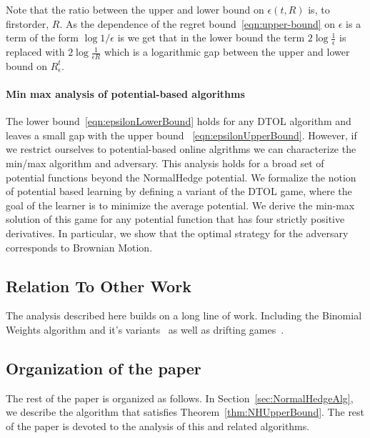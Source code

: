 \documentclass{article}[12pt]
\begin{document}

Note that the ratio between the upper and lower bound on
$\epsilon(t,R)$ is, to firstorder, $R$. As the dependence of the
regret bound~\ref{eqn:upper-bound} on $\epsilon$ is a term of the form
$\log 1/\epsilon$ is we get that in the lower bound the term
$2\log \frac{1}{\epsilon}$ is replaced with
$2 \log \frac{1}{\epsilon R}$ which is a logarithmic gap between the
upper and lower bound on $R^t_\epsilon$.

\paragraph{Min max analysis of potential-based algorithms}
The lower bound~\ref{eqn:epsilonLowerBound} holds for any DTOL
algorithm and leaves a small gap with the upper bound
~\ref{eqn:epsilonUpperBound}. However, if we restrict ourselves to
potential-based online algrithms we can characterize the min/max
algorithm and adversary. This analysis holds for a broad set of
potential functions beyond the NormalHedge potential.  We formalize
the notion of potential based learning by defining a variant of the
DTOL game, where the goal of the learner is to minimize the average
potential. We derive the min-max solution of this game for any
potential function that has four strictly positive derivatives. In
particular, we show that the optimal strategy for the adversary
corresponds to Brownian Motion.

\subsection{Relation To Other Work}

The analysis described here builds on a long line of work. Including
the Binomial Weights algorithm and it's
variants~\cite{cesa1996line,abernethy2006continuous,abernethy2008optimal}
as well as drifting games~\cite{schapire2001drifting,freund2002drifting}.

\subsection{Organization of the paper}
The rest of the paper is organized as follows. In
Section~\ref{sec:NormalHedgeAlg}, we describe the algorithm that
satisfies Theorem~\ref{thm:NHUpperBound}. The rest of the paper is
devoted to the analysis of this and related algorithms.
\end{document}
